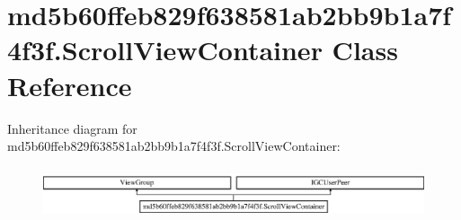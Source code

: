 \hypertarget{classmd5b60ffeb829f638581ab2bb9b1a7f4f3f_1_1ScrollViewContainer}{}\section{md5b60ffeb829f638581ab2bb9b1a7f4f3f.\+Scroll\+View\+Container Class Reference}
\label{classmd5b60ffeb829f638581ab2bb9b1a7f4f3f_1_1ScrollViewContainer}
Inheritance diagram for md5b60ffeb829f638581ab2bb9b1a7f4f3f.\+Scroll\+View\+Container\+:\begin{figure}[H]
\begin{center}
\leavevmode
\includegraphics[height=1.517615cm]{classmd5b60ffeb829f638581ab2bb9b1a7f4f3f_1_1ScrollViewContainer}
\end{center}
\end{figure}

